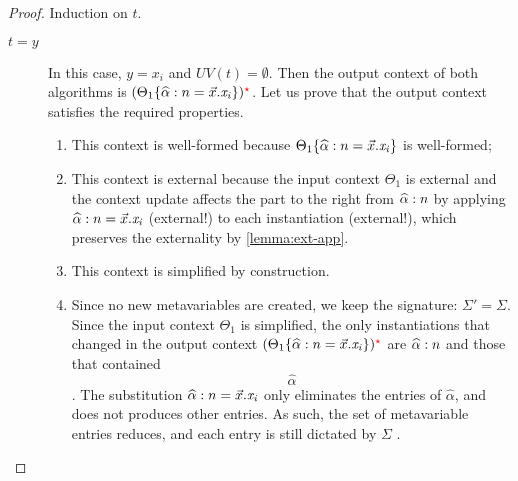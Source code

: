 \documentclass[a4,natbib=false]{article}
\begin{document}
\begin{proof}
  Induction on $t$.
  \begin{description}
  \item[$t = y$] In this case, $y = x_i$ and $UV(t) = \emptyset$.
    Then the output context of both algorithms is $ (  \Theta_{{\mathrm{1}}}  \{  \widehat{\alpha}  :  n  =  \vec{x}  .  \mathit{x_{\mathit{i}}}  \}  ) ^{\color{red}\star} $.
    Let us prove that the output context satisfies the required properties.
    \begin{enumerate}
      \item This context is well-formed because $\Theta_{{\mathrm{1}}}  \{  \widehat{\alpha}  :  n  =  \vec{x}  .  \mathit{x_{\mathit{i}}}  \}$ is well-formed;
      \item This context is external because the input context $\Theta_{{\mathrm{1}}}$ is
        external and the context update affects the part to the right from
        $\widehat{\alpha}  :  n$ by applying $\widehat{\alpha}  :  n  =  \vec{x}  .  \mathit{x_{\mathit{i}}}$ (external!) to each
        instantiation (external!), which preserves the externality by
        \cref{lemma:ext-app}.
      \item This context is simplified by construction.
      \item Since no new metavariables are created, we keep the signature:
        $\Sigma' = \Sigma$. Since the input context $\Theta_{{\mathrm{1}}}$ is simplified,
        the only instantiations that changed in the output context
        $ (  \Theta_{{\mathrm{1}}}  \{  \widehat{\alpha}  :  n  =  \vec{x}  .  \mathit{x_{\mathit{i}}}  \}  ) ^{\color{red}\star} $ are $\widehat{\alpha}  :  n$
        and those that contained $$\widehat{\alpha}$$. The substitution  
        $\widehat{\alpha}  :  n  =  \vec{x}  .  \mathit{x_{\mathit{i}}}$ only eliminates the entries of $\widehat{\alpha}$,
        and does not produces other entries. As such, the set of metavariable
        entries reduces, and each entry is still dictated by $\Sigma$ .
    \end{enumerate}


\end{description}
\end{proof}
\end{document}
